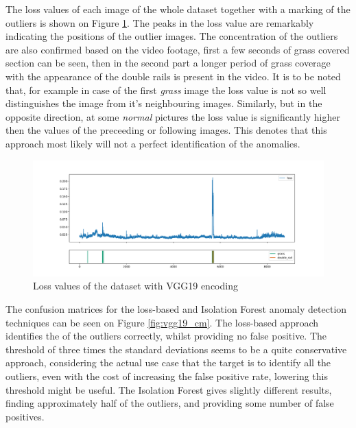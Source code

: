 The loss values of each image of the whole dataset together with a marking of the outliers is shown
on Figure \ref{fig:vgg19_loss}.
The peaks in the loss value are remarkably indicating the positions of the outlier images.
The concentration of the outliers are also confirmed based on the video footage, first a few seconds
of grass covered section can be seen, then in the second part a longer period of grass coverage
with the appearance of the double rails is present in the video.
It is to be noted that, for example in case of the first \emph{grass} image the loss value is not
so well distinguishes the image from it's neighbouring images.
Similarly, but in the opposite direction, at some \emph{normal} pictures the loss value is significantly
higher then the values of the preceeding or following images.
This denotes that this approach most likely will not a perfect identification of the anomalies.

\begin{figure}[!ht]
    \centering
    \includegraphics[width=\textwidth,trim={0 1cm 0 1cm},clip]{./results/vgg19_vgg19/20230510_172958_feature_vectors_loss.png}
    \caption{Loss values of the dataset with VGG19 encoding}
    \label{fig:vgg19_loss}
\end{figure}

The confusion matrices for the loss-based and Isolation Forest anomaly detection techniques can be seen
on Figure \ref{fig:vgg19_cm}.
The loss-based approach identifies the \small {} of the outliers correctly,
whilst providing no false positive.
The threshold of three times the standard deviations seems to be a quite conservative approach,
considering the actual use case that the target is to identify all the outliers, even with the cost
of increasing the false positive rate, lowering this threshold might be useful.
The Isolation Forest gives slightly different results, finding approximately half of the outliers,
and providing some number of false positives.

